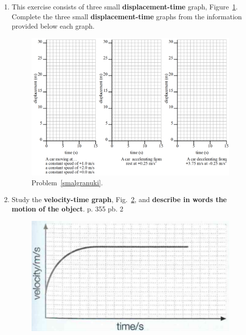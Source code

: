 \documentclass[A4,12pt]{article}
\begin{document}
\begin{enumerate}[label=\bfseries (\arabic*)]
\item \label{smalgranuki} This exercise consists of three small \textbf{displacement-time} graph, Figure~\ref{xmallii}. Complete the three small \textbf{displacement-time} graphs from the information provided below each graph.
%
\begin{figure}[H]
    \centering
    \includegraphics[width=0.9\columnwidth]{3mov.png}
    \caption{\label{xmallii} Problem~\ref{smalgranuki}.}
\end{figure}




















\item Study the \textbf{velocity-time graph}, Fig.~\ref{DESC}, and \textbf{describe in words the motion of the object}. \cite{CCEADA} p. 355 pb. 2
%
\begin{figure}[H]
    \centering
    \includegraphics[scale=0.4]{355-2.png}
    \caption{}
    \label{DESC}
\end{figure}











\end{enumerate}
\end{document}

